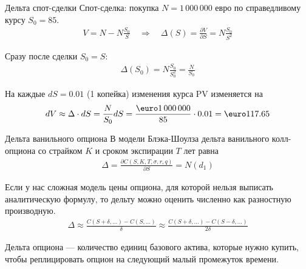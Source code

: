 \documentclass{beamer}
\renewcommand{\EUR}[1]{\textup{\euro}#1}
\begin{document}
\begin{frame}{Дельта спот-сделки}
\justify
Спот-сделка: покупка $N=1\,000\,000$ евро по справедливому курсу $S_0=85$.
\begin{align*}
V = N - N\frac{S_0}{S} \quad \Rightarrow \quad \Delta(S) = \frac{\partial V}{\partial S} = N\frac{S_0}{S^2}
\end{align*}

\justify
Сразу после сделки $S_0=S$:
\begin{align*}
\Delta(S_0) = N\frac{S_0}{S_0^2} = \frac{N}{S_0}
\end{align*}

\justify
На каждые $dS=0.01$ (1 копейка) изменения курса PV изменяется на
\begin{align*}
dV \approx \Delta \cdot dS = \frac{N}{S_0}dS = \frac{\EUR{1\,000\,000}}{85}\cdot 0.01 = \EUR{117.65}
\end{align*}
\end{frame}



\begin{frame}{Дельта ванильного опциона}
\justify
В модели Блэка-Шоулза дельта ванильного колл-опциона со страйком $K$ и сроком экспирации $T$ лет равна
\begin{align*}
\Delta = \frac{\partial C(S, K, T, \sigma, r, q)}{\partial S} = N(d_1)
\end{align*}

\justify
Если у нас сложная модель цены опциона, для которой нельзя выписать аналитическую формулу, то дельту можно оценить численно как разностную производную.
\begin{align*}
\Delta \approx \frac{C(S+\delta,...) - C(S,...)}{\delta} \approx \frac{C(S+\delta,...) - C(S-\delta,...)}{2\delta}
\end{align*}

\justify
Дельта опциона --- количество единиц базового актива, которые нужно купить, чтобы реплицировать опцион на следующий малый промежуток времени.
\end{frame}
\end{document}
